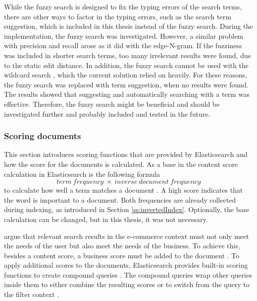 While the fuzzy search is designed to fix the typing errors of the search terms, 
there are other ways to factor in the typing errors, 
such as the search term suggestion, which is included in this thesis instead of the fuzzy search.
During the implementation, the fuzzy search was investigated.
However, a similar problem with precision and recall arose as it did with the edge-N-gram. 
If the fuzziness was included in shorter search terms, 
too many irrelevant results were found, due to the static edit distance.
In addition, the fuzzy search cannot be used with the wildcard search \cite{elasticIntro},
which the current solution relied on heavily.
For these reasons, the fuzzy search was replaced with term suggestion, when no results were found.
The results showed that suggesting and automatically searching with a term was effective.
Therefore, the fuzzy search might be beneficial and should be investigated further and probably included and tested 
in the future.



\subsubsection{Scoring documents}

This section introduces scoring functions that are provided by Elasticsearch and 
how the score for the documents is calculated.
As a base in the content score calculation in Elasticsearch is the following formula
\[ term\ frequency\ \times\ inverse\ document\ frequency \]
to calculate how well a term matches a document \cite{relevantSearch}.
A high score indicates that the word is important to a document.
Both frequencies are already collected during indexing, as introduced 
in Section \ref{ss:invertedIndex}.
Optionally, the base calculation can be changed, but in this thesis, it was not necessary.


\citeauthor{relevantSearch} \cite{relevantSearch} argue that relevant search results in the e-commerce
context must not only meet the needs of the user but also meet the needs of the business.
To achieve this, besides a content score, a business score must be added to the document
\cite{relevantSearch}.
To apply additional scores to the documents, Elasticsearch provides built-in scoring functions
to create compound queries \cite{elasticIntro}.
The compound queries wrap other queries inside them to either combine the resulting scores
or to switch from the query to the filter context \cite{elasticIntro}.



